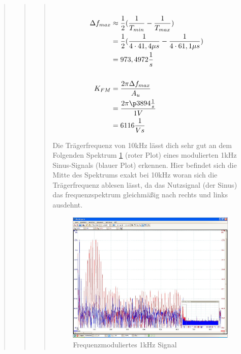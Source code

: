 \begin{quote}
\begin{quote}
\begin{quote}
            
            \begin{equation*}
            \begin{split}
            \\
                \Delta f_{max} &\approx \frac{1}{2} (\frac{1}{T_{min}} - \frac{1}{T_{max}})\\
                               &= \frac{1}{2} (\frac{1}{4\cdot41,4 \mu s}
                               -\frac{1}{4\cdot61,1 \mu s})\\
                               &= 973,4972 \frac{1}{s}\\
            \\
                K_{FM} &=\frac{2 \pi \Delta f_{max}}{A_u}\\
                       &= \frac{2 \pi \p 3894 \frac{1}{s}}{1V}\\
                       &=   6116 \frac{1}{Vs}
            \\
            \end{split}
            \end{equation*}
            \label{equ:fm}
            
            Die Trägerfrequenz von \si{10}{kHz} lässt dich sehr gut an dem Folgenden Spektrum \ref{fig:freq_1k} (roter Plot)
            eines modulierten \si{1}{kHz} Sinus-Signals (blauer Plot) erkennen. Hier befindet sich die Mitte des Spektrums exakt bei
            \si{10}{kHz} woran sich die Trägerfrequenz ablesen lässt, da das Nutzsignal (der Sinus) das frequenzspektrum
            gleichmäßig nach rechts und links ausdehnt.
            
            \begin{figure}[H]
            \centering
                \includegraphics[scale=0.5, trim = 0.25cm 1.3cm 1cm 3.2cm, clip]{Bilder/freq_1k}
                    \caption{Frequenzmoduliertes 1kHz Signal}
                    \label{fig:freq_1k}
            \end{figure}
            

\end{quote}
\end{quote}
\end{quote}
